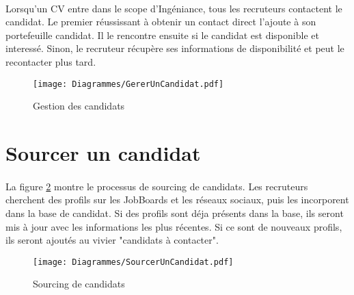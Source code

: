 \paragraph{} Lorsqu'un CV entre dans le scope d'Ingéniance, tous les recruteurs contactent le candidat. Le premier réussissant à obtenir un contact direct l'ajoute à son portefeuille candidat. Il le rencontre ensuite si le candidat est disponible et interessé. Sinon, le recruteur récupère ses informations de disponibilité et peut le recontacter plus tard.

\begin{figure}
	\centering
	\texttt{[image: Diagrammes/GererUnCandidat.pdf]}
	\caption{Gestion des candidats}
	\label{gestionCandidats}	
\end{figure}

\section{Sourcer un candidat}

\paragraph{} La figure \ref{sourcing} montre le processus de sourcing de candidats. Les recruteurs cherchent des profils sur les JobBoards et les réseaux sociaux, puis les incorporent dans la base de candidat. Si des profils sont déja présents dans la base, ils seront mis à jour avec les informations les plus récentes. Si ce sont de nouveaux profils, ils seront ajoutés au vivier "candidats à contacter".

\begin{figure}
	\centering
	\begin{sideways}
	\texttt{[image: Diagrammes/SourcerUnCandidat.pdf]}
	\end{sideways}
	\caption{Sourcing de candidats}
	\label{sourcing}	
\end{figure}

